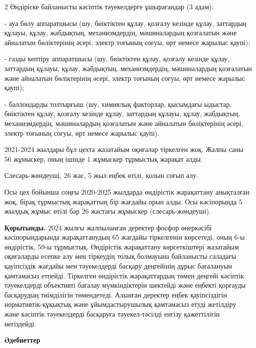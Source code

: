 \begin{multicols}{2}
Өндіріске байланысты кәсіптік тәуекелдерге ұшырағандар (3 адам):

- ауа бөлу аппаратшысы (шу, биіктіктен құлау, қозғалу кезінде құлау,
заттардың құлауы, құлау, жабдықтың, механизмдердің, мәшиналардың
қозғалатын және айналатын бөліктерінің әсері, электр тоғының соғуы, өрт
немесе жарылыс қаупі);

- газды кептіру аппаратшысы (шу, биіктіктен құлау, қозғалу кезінде
құлау, заттардың құлауы, құлау, жабдықтың, механизмдердің,
мәшиналардың қозғалатын және айналатын бөліктерінің әсері, электр
тоғының соғуы, өрт немесе жарылыс қаупі);

- баллондарды толтырғыш (шу, химиялық факторлар, қысымдағы ыдыстар,
биіктіктен құлау, қозғалу кезінде құлау, заттардың құлауы, құлау,
жабдықтың, механизмдердің, мәшиналардың қозғалатын және айналатын
бөліктерінің әсері, электр тоғының соғуы, өрт немесе жарылыс қаупі).

2021-2024 жылдары бұл цехта жазатайым оқиғалар тіркелген жоқ. Жалпы саны
56 жұмыскер, оның ішінде 1 жұмыскер тұрмыстық жарақат алды.

Слесарь-жөндеуші, 26 жас, 5 жыл еңбек өтілі, қолын соғып алу.

Осы цех бойынша соңғы 2020-2025 жылдарда өндірістік жарақаттану
анықталған жоқ, бірақ тұрмыстық жарақаттың бір жағдайы орын алды. Осы
кәсіпорында 5 жылдық жұмыс өтілі бар 26 жастағы жұмыскер
(слесарь-жөндеуші).

{\bfseries Қорытынды.} 2024 жылғы жалпыланған деректер фосфор өнеркәсібі
кәсіпорындарында жарақаттанудың 65 жағдайы тіркелгенін көрсетеді, оның
6-ы өндірістік, 59-ы тұрмыстық. Өндірістік жарақаттану көрсеткіштері
жазатайым оқиғаларды есепке алу мен тіркеудің толық болмауына байланысты
саладағы қауіпсіздік жағдайы мен тәуекелдерді басқару деңгейінің дұрыс
бағалануын қамтамасыз етпейді. Тіркелген өндірістік жарақаттардың төмен
деңгейі кәсіптік тәуекелдерді объективті бағалау мүмкіндіктерін шектейді
және еңбекті қорғауды басқарудың тиімділігін төмендетеді. Алынған
деректер еңбек қауіпсіздігін нормативтік-құқықтық және ұйымдастырушылық
қамтамасыз етуді жетілдіру және кәсіптік тәуекелдерді басқаруға
тәуекел-тәсілді енгізу қажеттілігін негіздейді.
\end{multicols}

\begin{center}
{\bfseries Әдебиеттер}
\end{center}

